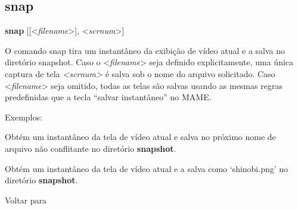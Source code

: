 \documentclass[letterpaper,10pt,brazil]{sphinxmanual}
\begin{document}
\subsection{snap}
\label{debugger/general:snap}\label{debugger/general:debugger-command-snap}
\begin{DUlineblock}{0em}
\item[]
\begin{DUlineblock}{\DUlineblockindent}
\item[] \textbf{snap} {[}{[}\textless{}\emph{filename}\textgreater{}{]}, \textless{}\emph{scrnum}\textgreater{}{]}
\item[] 
\end{DUlineblock}
\item[] O comando snap tira um instantâneo da exibição de vídeo atual e a salva no diretório snapshot. Caso o \textless{}\emph{filename}\textgreater{} seja definido explicitamente, uma única captura de tela \emph{\textless{}scrnum\textgreater{}} é salva sob o nome do arquivo solicitado. Caso \textless{}\emph{filename}\textgreater{} seja omitido, todas as telas são salvas usando as mesmas regras predefinidas que a tecla ``salvar instantâneo'' no MAME.
\item[] 
\item[] Exemplos:
\item[] 
\item[]
\begin{DUlineblock}{\DUlineblockindent}
\item[] 
\item[] 
\end{DUlineblock}
\item[] Obtém um instantâneo da tela de vídeo atual e salva no próximo nome de arquivo não conflitante no diretório \textbf{snapshot}.
\item[] 
\item[]
\begin{DUlineblock}{\DUlineblockindent}
\item[] 
\item[] 
\end{DUlineblock}
\item[] Obtém um instantâneo da tela de vídeo atual e a salva como `shinobi.png' no diretório \textbf{snapshot}.
\item[] 
\item[] Voltar para {\hyperref[debugger/general:debugger\string-general\string-list]{}}
\end{DUlineblock}
\begin{quote}
\label{debugger/general:debugger-command-source}\end{quote}
\end{document}

